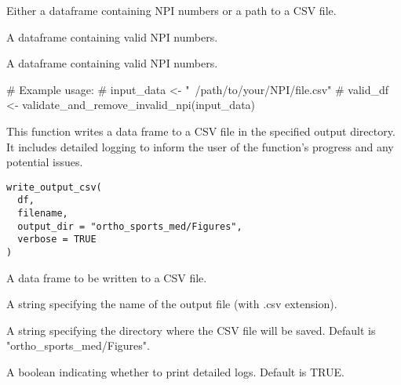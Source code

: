 \documentclass[a4paper]{book}
\begin{document}
%
\begin{Arguments}
\begin{ldescription}
\item[\code{input\_data}] Either a dataframe containing NPI numbers or a path to a CSV file.
\end{ldescription}
\end{Arguments}
%
\begin{Value}
A dataframe containing valid NPI numbers.

A dataframe containing valid NPI numbers.
\end{Value}
%
\begin{Examples}
\begin{ExampleCode}
# Example usage:
# input_data <- "~/path/to/your/NPI/file.csv"
# valid_df <- validate_and_remove_invalid_npi(input_data)

\end{ExampleCode}
\end{Examples}
%
\begin{Description}
This function writes a data frame to a CSV file in the specified output directory.
It includes detailed logging to inform the user of the function's progress and any potential issues.
\end{Description}
%
\begin{Usage}
\begin{verbatim}
write_output_csv(
  df,
  filename,
  output_dir = "ortho_sports_med/Figures",
  verbose = TRUE
)
\end{verbatim}
\end{Usage}
%
\begin{Arguments}
\begin{ldescription}
\item[\code{df}] A data frame to be written to a CSV file.

\item[\code{filename}] A string specifying the name of the output file (with .csv extension).

\item[\code{output\_dir}] A string specifying the directory where the CSV file will be saved. Default is "ortho\_sports\_med/Figures".

\item[\code{verbose}] A boolean indicating whether to print detailed logs. Default is TRUE.
\end{ldescription}
\end{Arguments}
\end{document}
